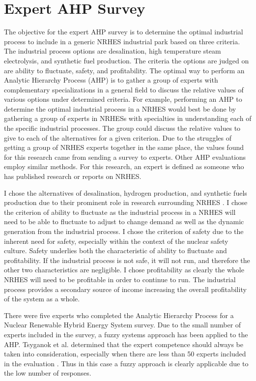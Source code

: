 \documentclass[12pt]{UIdahoMastersThesis}
\begin{document}
\section{Expert AHP Survey}
The objective for the expert AHP survey is to determine the optimal industrial process to include in a generic NRHES industrial park based on three criteria. The industrial process options are desalination, high temperature steam electrolysis, and synthetic fuel production. The criteria the options are judged on are ability to fluctuate, safety, and profitability. The optimal way to perform an Analytic Hierarchy Process (AHP) is to gather a group of experts with complementary specializations in a general field to discuss the relative values of various options under determined criteria. For example, performing an AHP to determine the optimal industrial process in a NRHES would best be done by gathering a group of experts in NRHESs with specialties in understanding each of the specific industrial processes. The group could discuss the relative values to give to each of the alternatives for a given criterion. Due to the struggles of getting a group of NRHES experts together in the same place, the values found for this research came from sending a survey to experts.  Other AHP evaluations employ similar methods\cite{Pan2008}. For this research, an expert is defined as someone who has published research or reports on NRHES.

	I chose the alternatives of desalination, hydrogen production, and synthetic fuels production due to their prominent role in research surrounding NRHES \cite{Bragg-Sitton2014,Locatelli2015,Kim2016,Bragg-Sitton2016,Garcia2016,Shropshire2011, Ruth2014,Bienvenu2015}.  I chose the criterion of ability to fluctuate as the industrial process in a NRHES will need to be able to fluctuate to adjust to change demand as well as the dynamic generation from the industrial process.  I chose the criterion of safety due to the inherent need for safety, especially within the context of the nuclear safety culture.  Safety underlies both the characteristic of ability to fluctuate and profitability. If the industrial process is not safe, it will not run, and therefore the other two characteristics are negligible. I chose profitability as clearly the whole NRHES will need to be profitable in order to continue to run.  The industrial process provides a secondary source of income  increasing the overall profitability of the system as a whole. 

There were five experts who completed the Analytic Hierarchy Process for a Nuclear Renewable Hybrid Energy System survey. Due to the small number of experts included in the survey, a fuzzy systems approach has been applied to the AHP. Tsyganok et al. determined that the expert competence should always be taken into consideration, especially when there are less than 50 experts included in the evaluation \cite{Tsyganok2012}. Thus in this case a fuzzy approach is clearly applicable due to the low number of responses.
\end{document}
